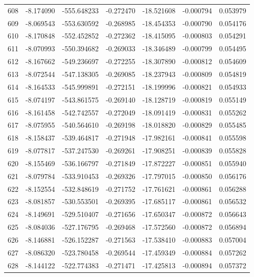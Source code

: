 \begin{tabular}{rrrrrrr}
 608 &  -8.174090 & -555.648233 & -0.272470 &  -18.521608 &   -0.000794 &  0.053979 \\
 609 &  -8.069543 & -553.630592 & -0.268985 &  -18.454353 &   -0.000790 &  0.054176 \\
 610 &  -8.170848 & -552.452852 & -0.272362 &  -18.415095 &   -0.000803 &  0.054291 \\
 611 &  -8.070993 & -550.394682 & -0.269033 &  -18.346489 &   -0.000799 &  0.054495 \\
 612 &  -8.167662 & -549.236697 & -0.272255 &  -18.307890 &   -0.000812 &  0.054609 \\
 613 &  -8.072544 & -547.138305 & -0.269085 &  -18.237943 &   -0.000809 &  0.054819 \\
 614 &  -8.164533 & -545.999891 & -0.272151 &  -18.199996 &   -0.000821 &  0.054933 \\
 615 &  -8.074197 & -543.861575 & -0.269140 &  -18.128719 &   -0.000819 &  0.055149 \\
 616 &  -8.161458 & -542.742557 & -0.272049 &  -18.091419 &   -0.000831 &  0.055262 \\
 617 &  -8.075955 & -540.564610 & -0.269198 &  -18.018820 &   -0.000829 &  0.055485 \\
 618 &  -8.158437 & -539.464817 & -0.271948 &  -17.982161 &   -0.000841 &  0.055598 \\
 619 &  -8.077817 & -537.247530 & -0.269261 &  -17.908251 &   -0.000839 &  0.055828 \\
 620 &  -8.155469 & -536.166797 & -0.271849 &  -17.872227 &   -0.000851 &  0.055940 \\
 621 &  -8.079784 & -533.910453 & -0.269326 &  -17.797015 &   -0.000850 &  0.056176 \\
 622 &  -8.152554 & -532.848619 & -0.271752 &  -17.761621 &   -0.000861 &  0.056288 \\
 623 &  -8.081857 & -530.553501 & -0.269395 &  -17.685117 &   -0.000861 &  0.056532 \\
 624 &  -8.149691 & -529.510407 & -0.271656 &  -17.650347 &   -0.000872 &  0.056643 \\
 625 &  -8.084036 & -527.176795 & -0.269468 &  -17.572560 &   -0.000872 &  0.056894 \\
 626 &  -8.146881 & -526.152287 & -0.271563 &  -17.538410 &   -0.000883 &  0.057004 \\
 627 &  -8.086320 & -523.780458 & -0.269544 &  -17.459349 &   -0.000884 &  0.057262 \\
 628 &  -8.144122 & -522.774383 & -0.271471 &  -17.425813 &   -0.000894 &  0.057372 \\

\end{tabular}
